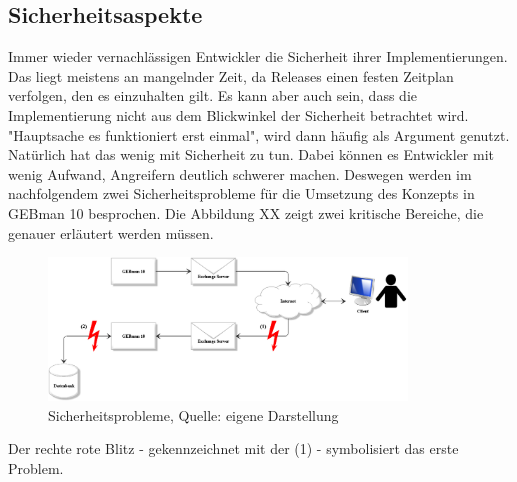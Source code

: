 \subsection{Sicherheitsaspekte}
\noindent
Immer wieder vernachlässigen Entwickler die Sicherheit ihrer Implementierungen. Das liegt meistens an mangelnder Zeit, da Releases einen festen Zeitplan verfolgen, den es einzuhalten gilt. Es kann aber auch sein, dass die Implementierung nicht aus dem Blickwinkel der Sicherheit betrachtet wird. "Hauptsache es funktioniert erst einmal", wird dann häufig als Argument genutzt. Natürlich hat das wenig mit Sicherheit zu tun. Dabei können es Entwickler mit wenig Aufwand, Angreifern deutlich schwerer machen. Deswegen werden im nachfolgendem zwei Sicherheitsprobleme für die Umsetzung des Konzepts in GEBman 10 besprochen. Die Abbildung XX zeigt zwei kritische Bereiche, die genauer erläutert werden müssen.

\begin{figure}[h!]
\centering
\includegraphics[width=0.85\textwidth]{Abbildungen/Sicherheitsprobleme.png}
	\caption[Sicherheitsprobleme]{Sicherheitsprobleme, Quelle: eigene Darstellung}
	\label{fig:Sicherheitsprobleme}
\end{figure}

\noindent
Der rechte rote Blitz - gekennzeichnet mit der (1) - symbolisiert das erste Problem.


